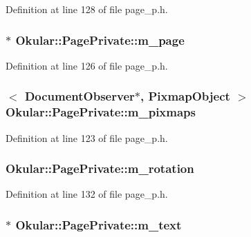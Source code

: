 Definition at line 128 of file page\+\_\+p.\+h.

\hypertarget{classOkular_1_1PagePrivate_a07c3e158a239c990c2ddcac53a6dd3c6}{
\subsubsection[{m\+\_\+page}]{$\ast$ Okular\+::\+Page\+Private\+::m\+\_\+page}}\label{classOkular_1_1PagePrivate_a07c3e158a239c990c2ddcac53a6dd3c6}


Definition at line 126 of file page\+\_\+p.\+h.

\hypertarget{classOkular_1_1PagePrivate_aa24cb69b4eb47c8798c1b06a88f93b6c}{
\subsubsection[{m\+\_\+pixmaps}]{$<$ {\bf Document\+Observer}$\ast$, {\bf Pixmap\+Object} $>$ Okular\+::\+Page\+Private\+::m\+\_\+pixmaps}}\label{classOkular_1_1PagePrivate_aa24cb69b4eb47c8798c1b06a88f93b6c}


Definition at line 123 of file page\+\_\+p.\+h.

\hypertarget{classOkular_1_1PagePrivate_a1560700ffacd812bbe962a21dc11be26}{
\subsubsection[{m\+\_\+rotation}]{ Okular\+::\+Page\+Private\+::m\+\_\+rotation}}\label{classOkular_1_1PagePrivate_a1560700ffacd812bbe962a21dc11be26}


Definition at line 132 of file page\+\_\+p.\+h.

\hypertarget{classOkular_1_1PagePrivate_a4cec09776018bc9ba579c2621dc0dbb6}{
\subsubsection[{m\+\_\+text}]{$\ast$ Okular\+::\+Page\+Private\+::m\+\_\+text}}\label{classOkular_1_1PagePrivate_a4cec09776018bc9ba579c2621dc0dbb6}


